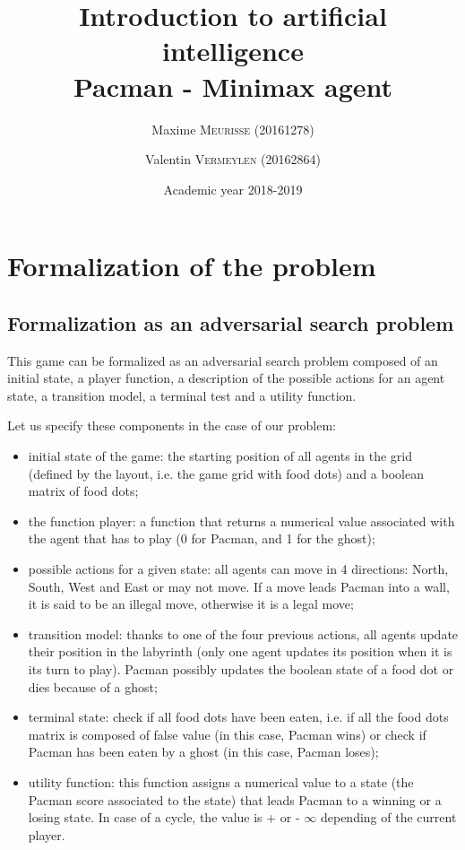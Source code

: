 \documentclass[a4paper, 11pt]{article}
\title{Introduction to artificial intelligence\\Pacman - Minimax agent}
\author{Maxime \textsc{Meurisse} (20161278)\and Valentin \textsc{Vermeylen} (20162864)}
\date{Academic year 2018-2019}
\begin{document}
    \maketitle
	
	\section{Formalization of the problem}
	
	
	\subsection{Formalization as an adversarial search problem}
	This game can be formalized as an adversarial search problem composed of an initial state, a player function, a description of the possible actions for an agent state, a transition model, a terminal test and a utility function.\par
	
	Let us specify these components in the case of our problem:
	\begin{itemize}
	    \item initial state of the game: the starting position of all agents in the grid (defined by the layout, i.e. the game grid with food dots) and a boolean matrix of food dots;
	    \item the function player: a function that returns a numerical value associated with the agent that has to play (0 for Pacman, and 1 for the ghost);
	    \item possible actions for a given state: all agents can move in 4 directions: North, South, West and East or may not move. If a move leads Pacman into a wall, it is said to be an illegal move, otherwise it is a legal move;
	    \item transition model: thanks to one of the four previous actions, all agents update their position in the labyrinth (only one agent updates its position when it is its turn to play). Pacman possibly updates the boolean state of a food dot or dies because of a ghost;
	    \item terminal state: check if all food dots have been eaten, i.e. if all the food dots matrix is composed of false value (in this case, Pacman wins) or check if Pacman has been eaten by a ghost (in this case, Pacman loses);
	    \item utility function: this function assigns a numerical value to a state (the Pacman score associated to the state) that leads Pacman to a winning or a losing state. In case of a cycle, the value is + or - \(\infty\) depending of the current player.
	\end{itemize}
	
\end{document}
